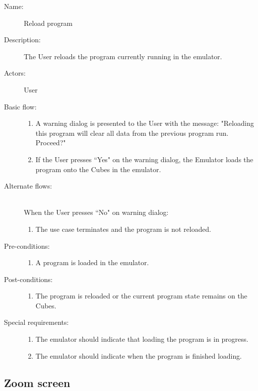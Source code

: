 \documentclass[12pt]{article}
\begin{document}
    \begin{description}
      \item[Name:] Reload program
      \item[Description:] The User reloads the program currently running in the emulator.
      \item[Actors:] User
      \item[Basic flow:] \hfill
        \begin{enumerate}
			\item{A warning dialog is presented to the User with the message: "Reloading this program will clear all data from the previous program run. Proceed?"}
			\item{If the User presses ``Yes" on the warning dialog, the Emulator loads the program onto the Cubes in the emulator.}
        \end{enumerate}
      \item[Alternate flows:] \hfill \\
	When the User presses ``No" on warning dialog:
        \begin{enumerate}
          \item{The use case terminates and the program is not reloaded.}
        \end{enumerate}
      \item[Pre-conditions:] \hfill
        \begin{enumerate}
	  \item{A program is loaded in the emulator.}
        \end{enumerate}
      \item[Post-conditions:] \hfill
        \begin{enumerate}
	  \item{The program is reloaded or the current program state remains on the Cubes.}
        \end{enumerate}
      \item[Special requirements:] \hfill
        \begin{enumerate}
          \item{The emulator should indicate that loading the program is in progress.}
	  \item{The emulator should indicate when the program is finished loading.}
        \end{enumerate}
    \end{description}

  \subsection{Zoom screen}
\end{document}
